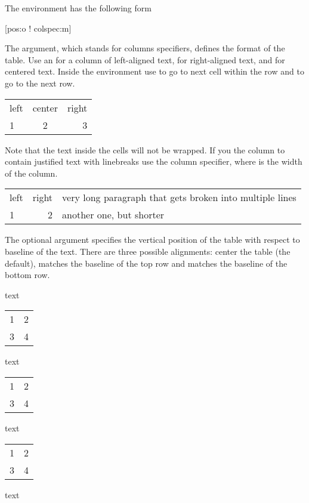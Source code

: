 The environment  has the following form
\begin{lscommand}
  [pos:o ! colspec:m]
\end{lscommand} %
The  argument, which stands for columns specifiers, defines the
format of the table. Use an  for a column of left-aligned text,
 for right-aligned text, and  for centered text. Inside the
environment use \ai{\&} to go to next cell within the row and
\ci{\textbackslash} to go to the next row.
\begin{example}
\begin{tabular}{lcr}
  left & center & right \\
  1    & 2      & 3     \\
\end{tabular}
\end{example}
Note that the text inside the cells will not be wrapped. If you the column to
contain justified text with linebreaks use the  column
specifier, where  is the width of the column.
\begin{example}[examplewidth=0.43\linewidth]
\begin{tabular}{lrp{3cm}}
  left & right & very long paragraph
                 that gets broken into
                 multiple lines \\
  1    & 2     & another one,
                 but shorter \\
\end{tabular}
\end{example}

The optional  argument specifies the vertical position of the table
with respect to baseline of the text. There are three possible alignments:
 center the table (the default),  matches the baseline of the
top row and  matches the baseline of the bottom row.
\begin{example}[examplewidth=0.55\linewidth]
text
\begin{tabular}{ll}
  1 & 2 \\
  3 & 4 \\
\end{tabular}
text
\begin{tabular}[t]{ll}
  1 & 2 \\
  3 & 4 \\
\end{tabular}
text
\begin{tabular}[b]{ll}
  1 & 2 \\
  3 & 4 \\
\end{tabular}
text
\end{example}


